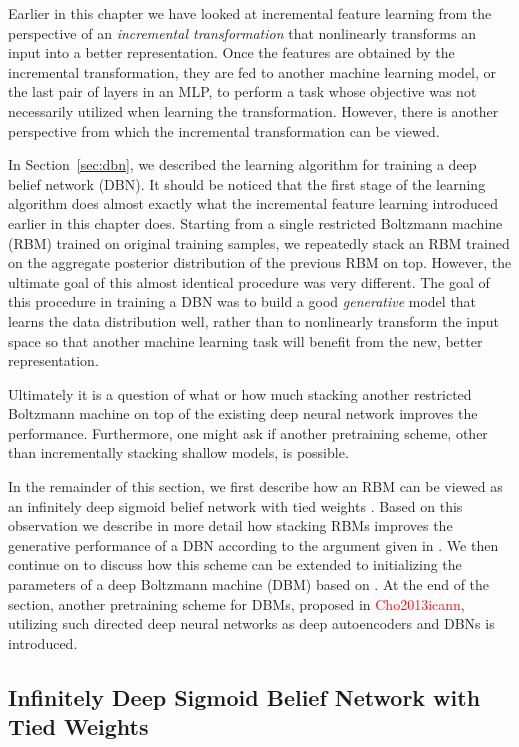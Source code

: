 \documentclass{now}
\newcommand{\alert}[1]{\textcolor{red}{#1}}
\newcommand{\citepub}[1]{\alert{#1}}
\begin{document}
Earlier in this chapter we have looked at incremental
feature learning from the perspective of an \textit{incremental
transformation} that nonlinearly transforms an input into a
better representation. Once the features are obtained by
the incremental transformation, they are fed to another
machine learning model, or the last pair of layers in an
MLP, to perform a task whose objective was not necessarily
utilized when learning the transformation. However, there is
another perspective from which the incremental
transformation can be viewed.

In Section~\ref{sec:dbn}, we described the learning
algorithm for training a deep belief network (DBN). 
It should be noticed that the first stage of the learning
algorithm does almost exactly what the incremental feature
learning introduced earlier in this chapter does. Starting
from a single restricted Boltzmann machine (RBM) trained on
original training samples, we repeatedly stack an RBM
trained on the aggregate posterior distribution of the
previous RBM on top.  However, the ultimate goal of this
almost identical procedure was very different.  The goal of
this procedure in training a DBN was to build a good
\textit{generative} model that learns the data distribution
well, rather than to nonlinearly transform the input space
so that another machine learning task will benefit from the
new, better representation.

Ultimately it is a question of what or how much
stacking another restricted Boltzmann machine on top of the
existing deep neural network improves the performance.
Furthermore, one might ask if another pretraining scheme,
other than incrementally stacking shallow models, is
possible.

In the remainder of this section, we first describe how an
RBM can be viewed as an infinitely deep sigmoid belief
network with tied weights \citep{Hinton2006nc}. Based on
this observation we describe in more detail how stacking
RBMs improves the generative performance of a DBN according
to the argument given in
\citep{Hinton2006nc,Salakhutdinov2012nc}.  We then continue
on to discuss how this scheme can be extended to
initializing the parameters of a deep Boltzmann machine
(DBM) based on
\citep{Salakhutdinov2012nc,Salakhutdinov2012}. At the end of
the section, another pretraining scheme for DBMs, proposed in
\citepub{Cho2013icann}, utilizing such directed deep neural
networks as deep autoencoders and DBNs is introduced.


\subsection{Infinitely Deep Sigmoid Belief Network with
Tied Weights}
\label{sec:inf_sbn_rbm}
\end{document}
